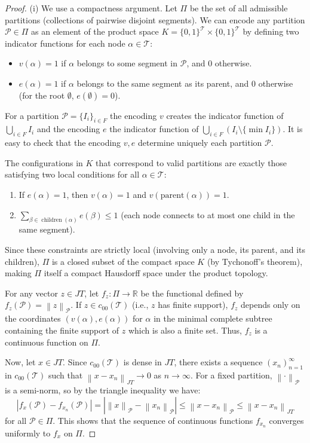 \documentclass[11pt,a4paper]{amsart}
\newcommand{\JT}{JT}
\newcommand{\Tree}{\mathcal{T}}
\newcommand{\norm}[1]{\left\lVert#1\right\rVert}
\begin{document}
\begin{proof}
   (i)  We use a compactness argument. Let $\Pi$ be the set of all admissible partitions (collections of pairwise disjoint segments). We can encode any partition $\mathcal{P} \in \Pi$ as an element of the product space $K = \{0, 1\}^{\Tree} \times \{0, 1\}^{\Tree}$ by defining two indicator functions for each node $\alpha \in \Tree$:
    \begin{itemize}
        \item $v(\alpha) = 1$ if $\alpha$ belongs to some segment in $\mathcal{P}$, and $0$ otherwise.
        \item $e(\alpha) = 1$ if $\alpha$ belongs to the same segment as its parent, and $0$ otherwise (for the root $\emptyset$, $e(\emptyset) = 0$).
    \end{itemize}
    For a partition $\mathcal{P} = \{ I_i\}_{i\in F}$ the encoding $v$ creates the indicator function of $\bigcup_{i\in F}I_i$ and 
    the encoding $e$ the indicator function of $ \bigcup_{i\in F} (I_i\setminus\{\min I_i\})$. It is easy to check that the encoding $v, e$ determine uniquely each partition $\mathcal{P}$.
    
    
    The configurations in $K$ that correspond to valid partitions are exactly those satisfying two local conditions for all $\alpha \in \Tree$:
    \begin{enumerate}
        \item If $e(\alpha) = 1$, then $v(\alpha) = 1$ and $v(\text{parent}(\alpha)) = 1$.
        \item $\sum_{\beta \in \operatorname{children}(\alpha)} e(\beta) \le 1$ (each node connects to at most one child in the same segment).
    \end{enumerate}
    Since these constraints are strictly local (involving only a node, its parent, and its children), $\Pi$ is a closed subset of the compact space $K$ (by Tychonoff's theorem), making $\Pi$ itself a compact Hausdorff space under the product topology.

    For any vector $z \in \JT$, let $f_z: \Pi \to \mathbb{R}$ be the functional defined by $f_z(\mathcal{P}) = \norm{z}_{\mathcal{P}}$. 
    If $z \in c_{00}(\Tree)$ (i.e., $z$ has finite support), $f_z$ depends only on the coordinates $(v(\alpha), e(\alpha))$ for $\alpha$ in the minimal complete subtree containing the finite support of $z$ which is also a finite set. Thus, $f_z$ is a continuous function on $\Pi$.

    Now, let $x \in \JT$. Since $c_{00}(\Tree)$ is dense in $\JT$, there exists a sequence $(x_n)_{n=1}^\infty$ in $c_{00}(\Tree)$ such that $\norm{x - x_n}_{\JT} \to 0$ as $n \to \infty$.
    For a fixed partition, $\norm{\cdot}_{\mathcal{P}}$ is a semi-norm, so by the triangle inequality we have:
    \[ |f_x(\mathcal{P}) - f_{x_n}(\mathcal{P})| = \left| \norm{x}_{\mathcal{P}} - \norm{x_n}_{\mathcal{P}} \right| \le \norm{x - x_n}_{\mathcal{P}} \le \norm{x - x_n}_{\JT} \]
    for all $\mathcal{P} \in \Pi$. This shows that the sequence of continuous functions $f_{x_n}$ converges uniformly to $f_x$ on $\Pi$.
    

\end{proof}
\end{document}
